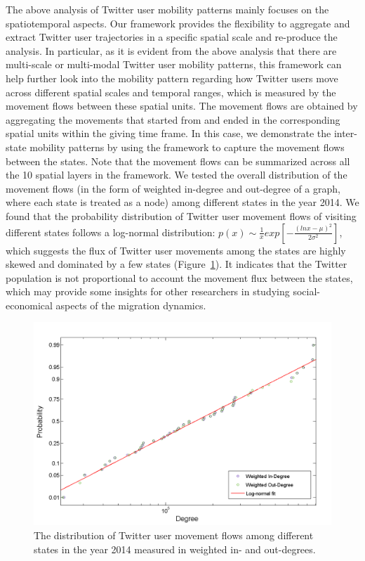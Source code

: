 \documentclass[ijgi,article,accept,moreauthors,pdftex,10pt,a4paper]{mdpi}
\theoremstyle{mdpi}
\newcounter{ex}
\newcounter{re}
\theoremstyle{mdpidefinition}
\begin{document}
The above analysis of Twitter user mobility patterns mainly focuses on the spatiotemporal aspects.
Our framework provides the flexibility to aggregate and extract Twitter user trajectories in a specific spatial scale and re-produce the analysis.
In particular, as it is evident from the above analysis that there are multi-scale or multi-modal Twitter user mobility patterns, this framework can help further look into the mobility pattern regarding how Twitter users move across different spatial scales and temporal ranges, which is measured by the movement flows between these spatial units.
The movement flows are obtained by aggregating the movements that started from and ended in the corresponding spatial units within the giving time frame.
In this case, we demonstrate the inter-state mobility patterns by using the framework to capture the movement flows between the states.
Note that the movement flows can be summarized across all the 10 spatial layers in the framework.
We tested the overall distribution of the movement flows (in the form of weighted in-degree and out-degree of a graph, where each state is treated as a node) among different states in the year 2014.
We found that the probability distribution of Twitter user movement flows of visiting different states follows a log-normal distribution: $p(x)\sim \frac{1}{x}exp[-\frac{(lnx - \mu)^{2}}{2\sigma^{2}}]$, which suggests the flux of Twitter user movements among the states are highly skewed and dominated by a few states (Figure~\ref{fig:state_flow}).
It indicates that the Twitter population is not proportional to account the movement flux between the states, which may provide some insights for other researchers in studying social-economical aspects of the migration dynamics.

\begin{figure}[ht]
\centering
\includegraphics[width=0.8\linewidth]{./figures/degree}
\caption{The distribution of Twitter user movement flows among different states in the year 2014 measured in weighted in- and out-degrees.}
\label{fig:state_flow}
\end{figure}
\FloatBarrier
\end{document}
